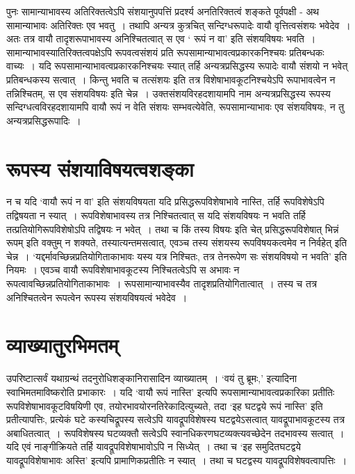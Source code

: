 {पुनः सामान्याभावस्य अतिरिक्तत्वेऽपि संशयानुपपत्तिं प्रदर्श्य अनतिरिक्तत्वं शङ्कते पूर्वपक्षी - अथ सामान्याभावः अतिरिक्तः एव भवतु~। तथापि अन्यत्र कुत्रचित् सन्दिग्धरूपादेः वायौ वृत्तित्वसंशयः भवेदेव~। अतः तत्र वायौ तादृशरूपाभावस्य अनिश्चितत्वात् स एव ‘ रूपं न वा’ इति संशयविषयः भवति~। सामान्याभावस्यातिरिक्तत्वपक्षेऽपि रूपवत्वसंशयं प्रति रूपसामान्याभावत्वप्रकारकनिश्चयः प्रतिबन्धकः वाच्यः~। यदि रूपसामान्याभावत्वप्रकारकनिश्चयः स्यात् तर्हि अन्यत्रप्रसिद्धस्य रूपादेः वायौ संशयो न भवेत् प्रतिबन्धकस्य सत्वात्~। किन्तु भवति च तत्संशयः इति तत्र विशेषाभावकूटनिश्चयेऽपि रूपाभावत्वेन  न तन्निश्चितम्, स एव संशयविषयः इति चेन्न~। उक्तसंशयविरहदशायामपि नाम अन्यत्रप्रसिद्धस्य रूपस्य सन्दिग्धत्वविरहदशायामपि वायौ रूपं न वेति संशयः सम्भवत्येवेति, रूपसामान्याभावः एव संशयविषयः, न तु अन्यत्रप्रसिद्धरूपादिः~। 

\section*{रूपस्य संशयाविषयत्वशङ्का}   

न च यदि ‘वायौ रूपं न वा’ इति संशयविषयता यदि प्रसिद्धरूपविशेषाभावे नास्ति, तर्हि रूपविशेषेऽपि तद्विषयता न स्यात्~। रूपविशेषाभावस्य तत्र निश्चितत्वात् स यदि संशयविषयः न भवति तर्हि तत्प्रतियोगिरूपविशेषोऽपि तद्विषयः न भवेत्~। तथा च किं तस्य विषयः इति चेत् प्रसिद्धरूपविशेषात् भिन्नं रूपम् इति वक्तुम् न शक्यते, तस्यात्यन्तमसत्वात्, एवञ्च तस्य संशयस्य रूपविषयकत्वमेव न निर्वहेत् इति चेन्न~। ‘यद्दर्मावच्छिन्नप्रतियोगिताकाभावः यस्य यत्र निश्चितः, तत्र तेनरूपेण सः  संशयविषयो न भवति’ इति नियमः~। एवञ्च वायौ रूपविशेषाभावकूटस्य निश्चितत्वेऽपि स अभावः न रूपत्वावच्छिन्नप्रतियोगिताकाभावः~। रूपसामान्याभावस्यैव तादृशप्रतियोगितात्वात्~। तस्य च तत्र अनिश्चितत्वेन रूपत्वेन रूपस्य संशयविषयत्वं भवेदेव~। 

\section*{व्याख्यातुरभिमतम्} 

उपरिष्टात्सर्वं यथाग्रन्थं तदनुरोधिशङ्कानिरासादिन व्याख्यातम्~। ‘वयं तु ब्रूमः,’ इत्यादिना स्वाभिमतमाविष्करोति प्रभाकारः~। यदि ‘वायौ रूपं नास्ति’ इत्यपि रूपसामान्याभावत्वप्रकारिका प्रतीतिः रूपविशेषाभावकूटविषयिणी एव, तयोरभावयोरनतिरेकादित्युच्यते, तदा ‘इह घटद्वये रूपं नास्ति’ इति प्रतीत्यापत्तिः, प्रत्येकं घटे कस्यचिद्रूपस्य सत्वेऽपि यावद्रूपविशेषस्य घटद्वयेऽसत्वात् यावद्रूपाभावकूटस्य तत्र अबाधितत्वात्~। रूपविशेषस्य घटव्यक्तौ सत्वेऽपि स्वानधिकरणघटव्यक्त्यवच्छेदेन तदभावस्य सत्वात्~। यदि एवं नाङ्गीक्रियते तर्हि यावद्रूपविशेषाभावोऽपि न सिध्येत्~। तथा च ‘इह समुदितघटद्वये यावद्रूपविशेषाभावः अस्ति’ इत्यपि प्रामाणिकप्रतीतिः न स्यात्~। तथा च घटद्वस्य यावद्रूपविशेषवत्वापत्तिः~। 

}
